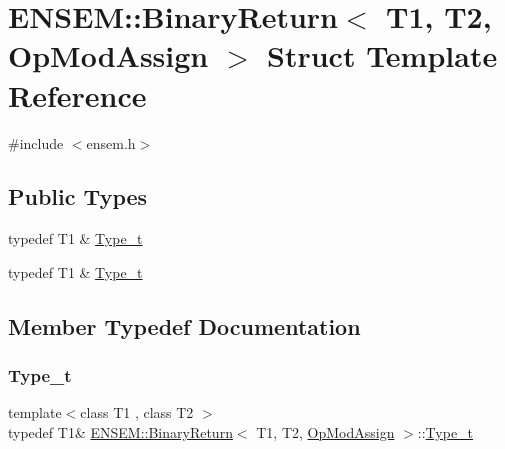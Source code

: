 \hypertarget{structENSEM_1_1BinaryReturn_3_01T1_00_01T2_00_01OpModAssign_01_4}{}\section{E\+N\+S\+EM\+:\+:Binary\+Return$<$ T1, T2, Op\+Mod\+Assign $>$ Struct Template Reference}
\label{structENSEM_1_1BinaryReturn_3_01T1_00_01T2_00_01OpModAssign_01_4}


{\ttfamily \#include $<$ensem.\+h$>$}

\subsection*{Public Types}
\begin{DoxyCompactItemize}
\item 
typedef T1 \& \mbox{\hyperlink{structENSEM_1_1BinaryReturn_3_01T1_00_01T2_00_01OpModAssign_01_4_ac06ca0711867d98edff9da57e7a2fcb3}{Type\+\_\+t}}
\item 
typedef T1 \& \mbox{\hyperlink{structENSEM_1_1BinaryReturn_3_01T1_00_01T2_00_01OpModAssign_01_4_ac06ca0711867d98edff9da57e7a2fcb3}{Type\+\_\+t}}
\end{DoxyCompactItemize}


\subsection{Member Typedef Documentation}
\mbox{\label{structENSEM_1_1BinaryReturn_3_01T1_00_01T2_00_01OpModAssign_01_4_ac06ca0711867d98edff9da57e7a2fcb3}} 
\subsubsection{\texorpdfstring{Type\_t}{Type\_t}\hspace{0.1cm}{\footnotesize\ttfamily [1/2]}}
{\footnotesize\ttfamily template$<$class T1 , class T2 $>$ \\
typedef T1\& \mbox{\hyperlink{structENSEM_1_1BinaryReturn}{E\+N\+S\+E\+M\+::\+Binary\+Return}}$<$ T1, T2, \mbox{\hyperlink{structENSEM_1_1OpModAssign}{Op\+Mod\+Assign}} $>$\+::\mbox{\hyperlink{structENSEM_1_1BinaryReturn_3_01T1_00_01T2_00_01OpModAssign_01_4_ac06ca0711867d98edff9da57e7a2fcb3}{Type\+\_\+t}}}

